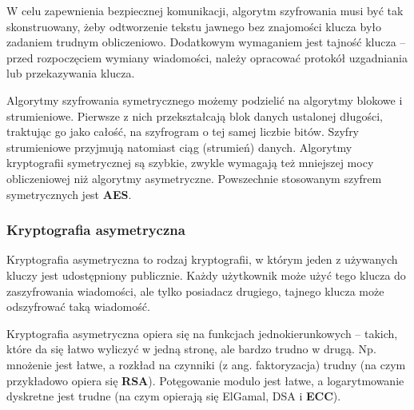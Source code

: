\documentclass[a4paper,12pt,oneside]{book}
\begin{document}
				W celu zapewnienia bezpiecznej komunikacji, algorytm szyfrowania musi być tak skonstruowany, żeby odtworzenie tekstu jawnego bez znajomości klucza było zadaniem trudnym obliczeniowo. Dodatkowym wymaganiem jest tajność klucza – przed rozpoczęciem wymiany wiadomości, należy opracować protokół uzgadniania lub przekazywania klucza.
				
				Algorytmy szyfrowania symetrycznego możemy podzielić na algorytmy blokowe i strumieniowe. Pierwsze z nich przekształcają blok danych ustalonej długości, traktując go jako całość, na szyfrogram o tej samej liczbie bitów. Szyfry strumieniowe przyjmują natomiast ciąg (strumień) danych. Algorytmy kryptografii symetrycznej są szybkie, zwykle wymagają też mniejszej mocy obliczeniowej niż algorytmy asymetryczne. Powszechnie stosowanym szyfrem symetrycznych jest \textbf{AES}.
				
				\subsubsection*{Kryptografia asymetryczna}
				
				Kryptografia asymetryczna to rodzaj kryptografii, w którym jeden z używanych kluczy jest udostępniony publicznie. Każdy użytkownik może użyć tego klucza do zaszyfrowania wiadomości, ale tylko posiadacz drugiego, tajnego klucza może odszyfrować taką wiadomość.
				
				Kryptografia asymetryczna opiera się na funkcjach jednokierunkowych – takich, które da się łatwo wyliczyć w jedną stronę, ale bardzo trudno w drugą. Np. mnożenie jest łatwe, a rozkład na czynniki (z ang. faktoryzacja) trudny (na czym przykładowo opiera się \textbf{RSA}). Potęgowanie modulo jest łatwe, a logarytmowanie dyskretne jest trudne (na czym opierają się ElGamal, DSA i \textbf{ECC}).
				
\end{document}
